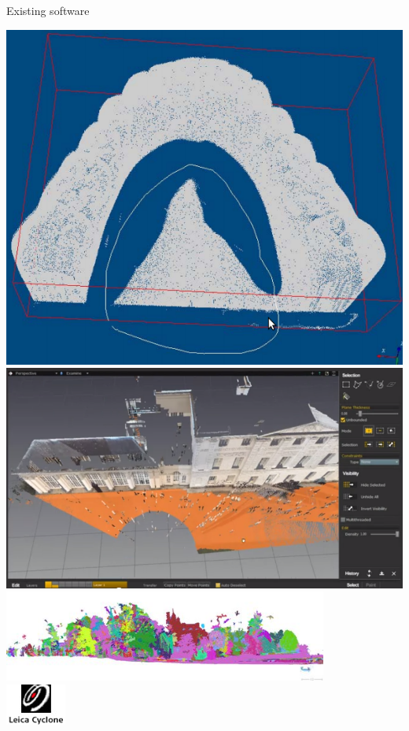 \documentclass{beamer}
\begin{document}
\begin{frame}{Existing software}
\centering

\includegraphics[height=0.35\textheight]{pics/lasso.png}
\includegraphics[height=0.35\textheight]{pics/plane.png}
\\
\includegraphics[width=0.8\textwidth]{pics/3DReshaper_auto_pt_cloud_seg.jpg}
\\
\includegraphics[height=0.10\textheight]{pics/cyclone.jpg}

\end{frame}
\end{document}
